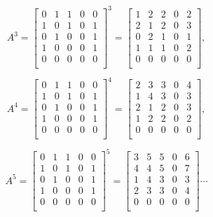 \vspace{-.15in}
\begin{align*}
A^3 = 
\begin{bmatrix}
0 & 1 & 1 & 0 & 0 \\
1 & 0 & 1 & 0 & 1 \\
0 & 1 & 0 & 0 & 1 \\
1 & 0 & 0 & 0 & 1 \\
0 & 0 & 0 & 0 & 0 \\
\end{bmatrix}^3 =
\begin{bmatrix}
 1 &  2 &  2 &  0 &  2 \\
 2 &  1 &  2 &  0 &  3 \\
 0 &  2 &  1 &  0 &  1 \\
 1 &  1 &  1 &  0 &  2 \\
 0 &  0 &  0 &  0 &  0 \\
\end{bmatrix},\\
\end{align*}
\begin{align*}
A^4 = 
\begin{bmatrix}
0 & 1 & 1 & 0 & 0 \\
1 & 0 & 1 & 0 & 1 \\
0 & 1 & 0 & 0 & 1 \\
1 & 0 & 0 & 0 & 1 \\
0 & 0 & 0 & 0 & 0 \\
\end{bmatrix}^4 =
\begin{bmatrix}
 2 &  3 &  3 &  0 &  4 \\
 1 &  4 &  3 &  0 &  3 \\
 2 &  1 &  2 &  0 &  3 \\
 1 &  2 &  2 &  0 &  2 \\
 0 &  0 &  0 &  0 &  0 \\
\end{bmatrix},\\
\end{align*}
\begin{align*}
A^5 = 
\begin{bmatrix}
0 & 1 & 1 & 0 & 0 \\
1 & 0 & 1 & 0 & 1 \\
0 & 1 & 0 & 0 & 1 \\
1 & 0 & 0 & 0 & 1 \\
0 & 0 & 0 & 0 & 0 \\
\end{bmatrix}^5 =
\begin{bmatrix}
 3 &  5 &  5 &  0 &  6 \\
 4 &  4 &  5 &  0 &  7 \\
 1 &  4 &  3 &  0 &  3 \\
 2 &  3 &  3 &  0 &  4 \\
 0 &  0 &  0 &  0 &  0 \\
\end{bmatrix} \cdots
\end{align*}
\vspace{-.15in}

